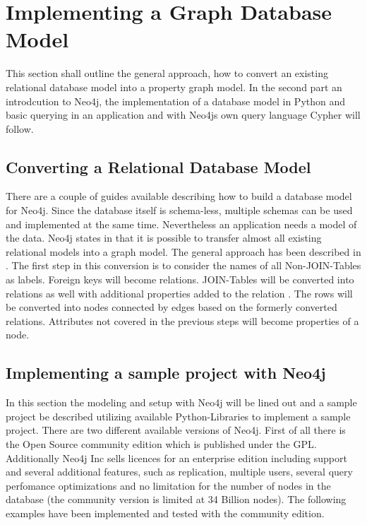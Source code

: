 \section{Implementing a Graph Database Model} \label{section3}
This section shall outline the general approach, how to convert an existing relational database model into a property graph model.
In the second part an introdcution to Neo4j, the implementation of a database model in Python and basic querying in an application and with Neo4js own query language \glqq Cypher\grqq{} will follow.

\subsection{Converting a Relational Database Model}
There are a couple of guides available describing how to build a database model for Neo4j. Since the database itself is schema-less, multiple schemas can be used and implemented at the same time.
Nevertheless an application needs a model of the data.
Neo4j states in \autocite{neo4j:rel_to_graph} that it is possible to transfer almost all existing relational models into a graph model.
The general approach has been described in \autocite{dzone:rel_to_graph}.
The first step in this conversion is to consider the names of all Non-JOIN-Tables as labels.
Foreign keys will become relations.
JOIN-Tables will be converted into relations as well with additional properties added to the relation \autocite{neo4j:graph_vs_rdbms}.
The rows will be converted into nodes connected by edges based on the formerly converted relations. Attributes not covered in the previous steps will become properties of a node.

\subsection{Implementing a sample project with Neo4j}
In this section the modeling and setup with Neo4j will be lined out and a sample project be described utilizing available Python-Libraries to implement a sample project.
There are two different available versions of Neo4j.
First of all there is the Open Source community edition which is published under the GPL.
Additionally Neo4j Inc sells licences for an enterprise edition \autocite{neo4j:editions} including support and several additional features, such as replication, multiple users, several query perfomance optimizations and no limitation for the number of nodes in the database (the community version is limited at 34 Billion nodes).
The following examples have been implemented and tested with the community edition.

